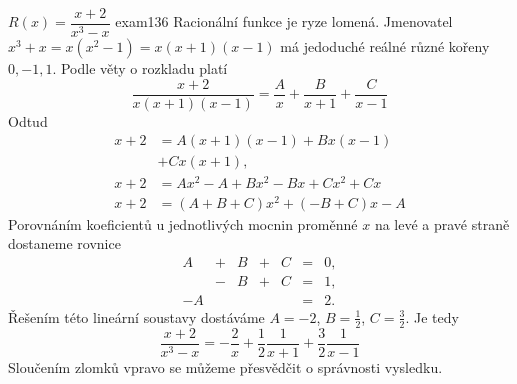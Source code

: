 \begin{mathexam}{\(R(x) = \dfrac{x + 2}{x^3 - x}\) \hfill\cite[p.~268]{Brabec1989}}{exam136}
  Racionální funkce je ryze lomená. Jmenovatel \(x^3 + x = x(x^2-1) = x(x+1)(x-1)\) má jedoduché
  reálné různé kořeny \(0,-1,1\). Podle věty o rozkladu platí
  \begin{equation*}
    \dfrac{x+2}{x(x+1)(x-1)} = \dfrac{A}{x} + \dfrac{B}{x+1} + \dfrac{C}{x-1}
  \end{equation*}
  Odtud
  \begin{align}
    x+2 &= A(x+1)(x-1) + Bx(x-1)            \nonumber          \\ 
        &+ Cx(x+1),                         \label{mai:eq162}  \\
    x+2 &= Ax^2 - A +Bx^2 - Bx + Cx^2 + Cx  \nonumber          \\
    x+2 &= (A+B+C)x^2 + (-B+C)x - A         \nonumber
  \end{align}
  Porovnáním koeficientů u jednotlivých mocnin proměnné \(x\) na levé a pravé straně dostaneme
  rovnice 
  \begin{equation*}
    \begin{array}{rcrcrcl}
       A &+& B &+& C &=&0, \\
         &-& B &+& C &=&1, \\
      -A & &   & &   &=&2. 
    \end{array}   
  \end{equation*}
  Řešením této lineární soustavy dostáváme \(A = -2\), \(B = \frac{1}{2}\), \(C = \frac{3}{2}\). Je
  tedy 
  \begin{equation}\label{mai:eq163}
    \dfrac{x+2}{x^3-x} = -\dfrac{2}{x} + \dfrac{1}{2}\dfrac{1}{x+1} + \dfrac{3}{2}\dfrac{1}{x-1}
  \end{equation} 
  Sloučením zlomků vpravo se můžeme přesvědčit o správnosti vysledku.
\end{mathexam}